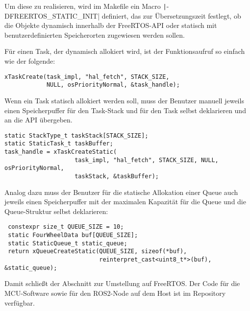 Um diese zu realisieren, wird im Makefile ein Macro
\texttt|-DFREERTOS_STATIC_INIT| definiert, das zur
Übersetzungszeit festlegt, ob die Objekte dynamisch innerhalb der FreeRTOS-API
oder statisch mit benutzerdefinierten Speicherorten zugewiesen werden sollen.

Für einen Task, der dynamisch allokiert wird, ist der Funktionsaufruf so einfach
wie der folgende:

\begin{code}
\begin{verbatim}
xTaskCreate(task_impl, "hal_fetch", STACK_SIZE,
            NULL, osPriorityNormal, &task_handle);
\end{verbatim}
\end{code}

Wenn ein Task statisch allokiert werden soll, muss der Benutzer manuell jeweils
einen Speicherpuffer für den Task-Stack und für den Task selbst deklarieren und
an die API übergeben.

\begin{code}
\begin{verbatim}
static StackType_t taskStack[STACK_SIZE];
static StaticTask_t taskBuffer;
task_handle = xTaskCreateStatic(
                    task_impl, "hal_fetch", STACK_SIZE, NULL, osPriorityNormal,
                    taskStack, &taskBuffer);
\end{verbatim}
\end{code}

Analog dazu muss der Benutzer für die statische Allokation einer Queue auch
jeweils einen Speicherpuffer mit der maximalen Kapazität für die Queue und die
Queue-Struktur selbst deklarieren:

\begin{code}
\begin{verbatim}
 constexpr size_t QUEUE_SIZE = 10;
 static FourWheelData buf[QUEUE_SIZE];
 static StaticQueue_t static_queue;
 return xQueueCreateStatic(QUEUE_SIZE, sizeof(*buf),
                           reinterpret_cast<uint8_t*>(buf), &static_queue);
\end{verbatim}
\end{code}

Damit schließt der Abschnitt zur Umstellung auf FreeRTOS. Der Code für die
MCU-Software sowie für den ROS2-Node auf dem Host ist im
Repository~\cite{mecarover_freertos_profiling} verfügbar.

